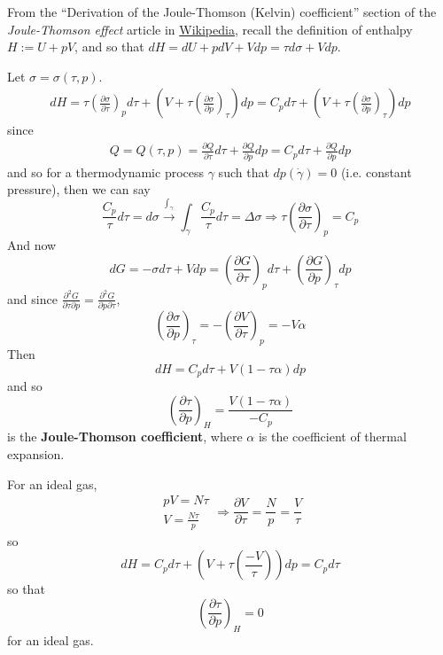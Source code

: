 From the ``Derivation of the Joule-Thomson (Kelvin) coefficient'' section of the \emph{Joule-Thomson effect} article in \href{https://en.wikipedia.org/wiki/Joule–Thomson_effect}{Wikipedia}, recall the definition of enthalpy $H:= U + pV$, and so that $dH= dU+ pdV + Vdp=\tau d\sigma + Vdp$.  

Let $\sigma = \sigma(\tau,p)$.  
\[
\begin{gathered}
  dH = \tau \left( \frac{ \partial \sigma}{ \partial \tau } \right)_p d\tau + (V + \tau \left( \frac{ \partial \sigma }{ \partial p }\right)_{\tau} ) dp = C_p d\tau + (V + \tau \left( \frac{ \partial \sigma }{ \partial p }\right)_{\tau} ) dp
\end{gathered}
\]
since
\[
\begin{gathered}
Q = Q(\tau,p) = \frac{ \partial Q}{ \partial \tau} d\tau + \frac{ \partial Q}{ \partial p } dp = C_p d\tau + \frac{ \partial Q}{ \partial p} dp
\end{gathered}
\]
and so for a thermodynamic process $\gamma$ such that $dp(\dot{\gamma})=0$ (i.e. constant pressure), then we can say
\[
\frac{C_p}{\tau}d\tau = d\sigma \xrightarrow{ \int_{\gamma } } \int_{\gamma} \frac{C_p}{\tau} d\tau = \Delta \sigma \Longrightarrow \tau \left( \frac{ \partial \sigma }{ \partial \tau } \right)_p = C_p
\]
And now 
\[
dG = -\sigma d\tau  + Vdp = \left( \frac{ \partial G}{ \partial \tau } \right)_p d\tau + \left( \frac{ \partial G}{ \partial p } \right)_{\tau} dp
\]
and since $\frac{ \partial^2 G}{ \partial \tau \partial p} = \frac{ \partial^2 G}{ \partial p \partial \tau}$, 
\[
\left( \frac{ \partial \sigma }{ \partial p } \right)_{\tau} = - \left( \frac{ \partial V}{ \partial \tau} \right)_p = -V\alpha
\]
Then
\[
dH = C_p d\tau + V(1-\tau \alpha) dp
\]
and so 
\begin{equation}\label{Eq:JouleThomsoncoeff}
\left( \frac{ \partial \tau}{ \partial p }\right)_H = \frac{ V(1-\tau \alpha )}{-C_p}
\end{equation}
is the \textbf{Joule-Thomson coefficient}, where $\alpha$ is the coefficient of thermal expansion.  

For an ideal gas, 
\[
\begin{gathered}
  pV = N\tau \\ 
  V = \frac{N\tau}{p}
\end{gathered} \Longrightarrow \frac{ \partial V}{ \partial \tau} = \frac{N}{p} = \frac{V}{\tau}
\]
so
\[
dH = C_pd\tau + ( V + \tau \left( \frac{-V}{\tau} \right) ) dp = C_p d\tau 
\]
so that 
\[
\left( \frac{ \partial \tau}{ \partial p} \right)_H = 0 
\]
for an ideal gas.  


